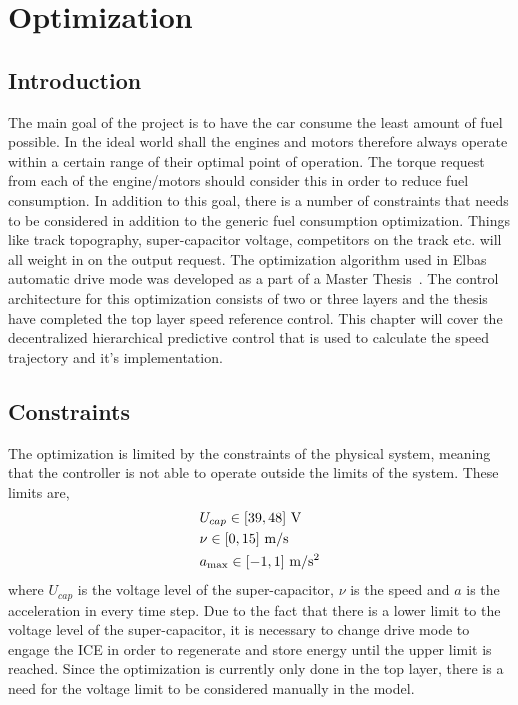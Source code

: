 \chapter{Optimization}
\section{Introduction}
The main goal of the project is to have the car consume the least amount of fuel
possible.  In the ideal world shall the engines and motors therefore always
operate within a certain range of their optimal point of operation. The torque
request from each of the engine/motors should consider this in order to reduce
fuel consumption. In addition to this goal, there is a number of constraints
that needs to be considered in addition to the generic fuel consumption
optimization.  Things like track topography, super-capacitor voltage,
competitors on the track etc. will all weight in on the output request. The
optimization algorithm used in Elbas automatic drive mode was developed as a
part of a Master Thesis~\cite{liu2016}. The control architecture for this
optimization consists of two or three layers and the thesis have completed the
top layer speed reference control. This chapter will cover the decentralized
hierarchical predictive control that is used to calculate the speed trajectory
and it's implementation.

\section{Constraints}
The optimization is limited by the constraints of the physical system, meaning that
the controller is not able to operate outside the limits of the system. These limits
are,
\begin{align}
    &U_{cap} \in [39,48]~\textup{V} \\
    &\nu \in [0,15]~\textup{m/s}\\
    &a_{\max} \in [-1,1]~\textup{m/s$^2$}
\end{align}
where $U_{cap}$ is the voltage level of the super-capacitor, $\nu$ is the speed
and $a$ is the acceleration in every time step. Due to the fact that there is a
lower limit to the voltage level of the super-capacitor, it is necessary to
change drive mode to engage the ICE in order to regenerate and store energy
until the upper limit is reached. Since the optimization is currently only done
in the top layer, there is a need for the voltage limit to be considered
manually in the model.

